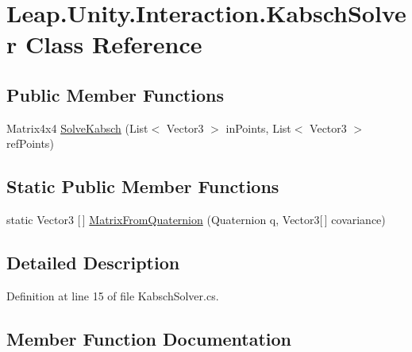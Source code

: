 \hypertarget{class_leap_1_1_unity_1_1_interaction_1_1_kabsch_solver}{}\section{Leap.\+Unity.\+Interaction.\+Kabsch\+Solver Class Reference}
\label{class_leap_1_1_unity_1_1_interaction_1_1_kabsch_solver}
\subsection*{Public Member Functions}
\begin{DoxyCompactItemize}
\item 
Matrix4x4 \mbox{\hyperlink{class_leap_1_1_unity_1_1_interaction_1_1_kabsch_solver_a6aac06a0dcbe2e7ac0a53b43b64bdcaf}{Solve\+Kabsch}} (List$<$ Vector3 $>$ in\+Points, List$<$ Vector3 $>$ ref\+Points)
\end{DoxyCompactItemize}
\subsection*{Static Public Member Functions}
\begin{DoxyCompactItemize}
\item 
static Vector3 \mbox{[}$\,$\mbox{]} \mbox{\hyperlink{class_leap_1_1_unity_1_1_interaction_1_1_kabsch_solver_a28fe7e92b8cb302758c2b5e86860af7b}{Matrix\+From\+Quaternion}} (Quaternion q, Vector3\mbox{[}$\,$\mbox{]} covariance)
\end{DoxyCompactItemize}


\subsection{Detailed Description}


Definition at line 15 of file Kabsch\+Solver.\+cs.



\subsection{Member Function Documentation}
\mbox{\label{class_leap_1_1_unity_1_1_interaction_1_1_kabsch_solver_a28fe7e92b8cb302758c2b5e86860af7b}} 
